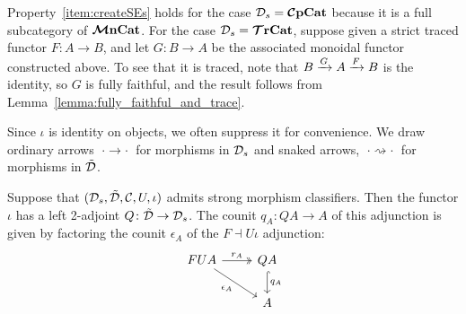 \documentclass[11pt,oneside,article]{memoir}
\begin{document}
\begin{example}
Property~\ref{item:createSEs} holds for the case $\mathcal{D}_s=\bm{\mathcal{C}}\mathbf{pCat}$ because it is a full
subcategory of $\bm{\mathcal{M}}\mathbf{nCat}$. For the case $\mathcal{D}_s=\bm{\mathcal{T}}\mathbf{rCat}$, suppose given a strict traced functor
$F\colon A\to B$, and let $G\colon B\to A$ be the associated monoidal functor constructed above. To
see that it is traced, note that $B\xrightarrow{G}A\xrightarrow{F}B$ is the identity, so $G$ is fully faithful, and
the result follows from Lemma~\ref{lemma:fully_faithful_and_trace}.
\end{example}

Since $\iota$ is identity on objects, we often suppress it for convenience. We draw ordinary arrows
$\;\cdot\to\cdot\;$ for morphisms in $\mathcal{D}_s$ and snaked arrows, $\;\cdot\rightsquigarrow\cdot\;$
for morphisms in $\tilde{\mathcal{D}}$.

\begin{theorem}
      \label{thm:strong_classifier}
   Suppose that $(\mathcal{D}_s,\tilde{\mathcal{D}},\mathcal{C},U,\iota)$ admits strong morphism classifiers. Then the
   functor $\iota$ has a left 2-adjoint $Q\colon\tilde{\mathcal{D}}\to\mathcal{D}_s$. The counit $q_A\colon QA\to A$
   of this adjunction is given by factoring the counit $\epsilon_A$ of the $F\dashv U\iota$
   adjunction:
   \begin{equation} \begin{tikzcd}
         \label{eqn:factorization_counit}
      FUA \ar[r,two heads,"r_A"] \ar[dr,"\epsilon_A"']
         & QA \ar[d,hook,"q_A"] \\
      & A
   \end{tikzcd} \end{equation}
\end{theorem}
\end{document}
